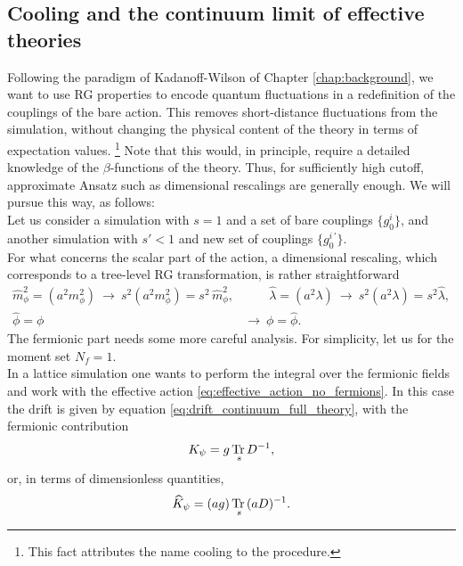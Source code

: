 \subsection{Cooling and the continuum limit of effective theories}
Following the paradigm of Kadanoff-Wilson of Chapter \ref{chap:background}, we want to use RG properties to encode quantum fluctuations in a redefinition of the couplings of the bare action. This removes short-distance fluctuations from the simulation, without changing the physical content of the theory in terms of expectation values. \footnote{This fact attributes the name cooling to the procedure.}
Note that this would, in principle, require a detailed knowledge of the $\beta$-functions of the theory. Thus, for sufficiently high cutoff, approximate Ansatz such as dimensional rescalings are generally enough. We will pursue this way, as follows: \\
Let us consider a simulation with $s=1$ and a set of bare couplings $\{g^i_0\}$, and another simulation with $s'<1$ and new set of couplings $\{g^{i \, \prime}_0\}$. \\
For what concerns the scalar part of the action, a dimensional rescaling, which corresponds to a tree-level RG transformation, is rather straightforward
\begin{equation*}
    \begin{aligned}
    \hat{m}_\phi^2 = (a^2m_\phi^2) \ \to \ s^2(a^2m_\phi^2) = s^2 \, \hat{m}_\phi^2, &\qquad \hat{\lambda} = (a^2\lambda) \ \to  \ s^2 (a^2\lambda) = s^2\hat{\lambda}, \\
    \hat\phi = \phi \ &\to \ \phi = \hat\phi.
    \end{aligned}
\end{equation*}
The fermionic part needs some more careful analysis. For simplicity, let us for the moment set $N_f = 1$. \\
In a lattice simulation one wants to perform the integral over the fermionic fields and work with the effective action \eqref{eq:effective_action_no_fermions}. In this case the drift is given by equation \eqref{eq:drift_continuum_full_theory}, with the fermionic contribution
\begin{equation}
    	K_{\psi} = g \, \underset{s}{\operatorname{\text{Tr} \,}}{D^{-1}},
	\label{eq:fermionic_drift_contribution}
\end{equation}
or, in terms of dimensionless quantities,
\begin{equation*}
    \widehat{K}_{\psi} = (ag) \, \underset{s}{\operatorname{\text{Tr} \,}}{(aD)^{-1}}.
\end{equation*}
